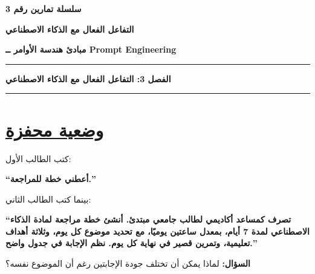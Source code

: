 \documentclass[a4paper]{article}
\begin{document}

\begin{center}

{\Large\khatt\textbf{سلسلة تمارين رقم 3}}

\vspace{0.15cm}

{\Large\khatt\textbf{التفاعل الفعال مع الذكاء الاصطناعي}}

\vspace{0.1cm}

{\khatt\textbf{مبادئ هندسة الأوامر ــ Prompt Engineering}}

\end{center}

\rule{\textwidth}{1pt}

\begin{center}

{\khatt\textbf{
الفصل 3: التفاعل الفعال مع الذكاء الاصطناعي
}}

\end{center}

\rule{\textwidth}{1pt}


\section*{\khatt\underline{وضعية محفزة }}

كتب الطالب الأول:



\textbf{
``أعطني خطة للمراجعة.''
}


بينما كتب الطالب الثاني:

\begin{center}

\textbf{
``تصرف كمساعد أكاديمي لطالب جامعي مبتدئ.
أنشئ خطة مراجعة لمادة الذكاء الاصطناعي لمدة 7 أيام،
بمعدل ساعتين يوميًا، مع تحديد موضوع كل يوم،
وثلاثة أهداف تعليمية، وتمرين قصير في نهاية كل يوم.
نظم الإجابة في جدول واضح.''
}

\end{center}

\textbf{السؤال:}
لماذا يمكن أن تختلف جودة الإجابتين رغم أن الموضوع نفسه؟

\vspace{0.2cm}

\end{document}
